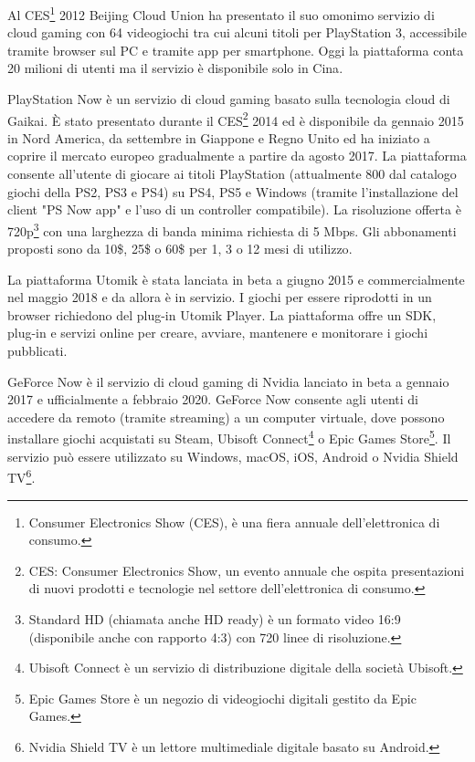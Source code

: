 Al CES\footnote{Consumer Electronics Show (CES), è una fiera annuale dell'elettronica di consumo.} 2012 Beijing Cloud Union ha presentato il suo omonimo servizio di cloud gaming con 64 videogiochi tra cui alcuni titoli per PlayStation 3, accessibile tramite browser sul PC e tramite app per smartphone. Oggi la piattaforma conta 20 milioni di utenti ma il servizio è disponibile solo in Cina\cite{CloudUnion}.

PlayStation Now è un servizio di cloud gaming basato sulla tecnologia cloud di Gaikai. È stato presentato durante il CES\footnote{CES: Consumer Electronics Show, un evento annuale che ospita presentazioni di nuovi prodotti e tecnologie nel settore dell'elettronica di consumo.} 2014 ed è disponibile da gennaio 2015 in Nord America, da settembre in Giappone e Regno Unito ed ha iniziato a coprire il mercato europeo gradualmente a partire da agosto 2017. La piattaforma consente all'utente di giocare ai titoli PlayStation (attualmente 800 dal catalogo giochi della PS2, PS3 e PS4) su PS4, PS5 e Windows (tramite l'installazione del client "PS Now app" e l'uso di un controller compatibile). La risoluzione offerta è 720p\footnote{Standard HD (chiamata anche HD ready) è un formato video 16:9 (disponibile anche con rapporto 4:3) con 720 linee di risoluzione.} con una larghezza di banda minima richiesta di 5 Mbps. Gli abbonamenti proposti sono da 10\$, 25\$ o 60\$ per 1, 3 o 12 mesi di utilizzo\cite{PlayStation_Now}.

La piattaforma Utomik è stata lanciata in beta a giugno 2015 e commercialmente nel maggio 2018 e da allora è in servizio. I giochi per essere riprodotti in un browser richiedono del plug-in Utomik Player. La piattaforma offre un SDK, plug-in e servizi online per creare, avviare, mantenere e monitorare i giochi pubblicati\cite{Utomik}.

GeForce Now è il servizio di cloud gaming di Nvidia lanciato in beta a gennaio 2017 e ufficialmente a febbraio 2020. GeForce Now consente agli utenti di accedere da remoto (tramite streaming) a un computer virtuale, dove possono installare giochi acquistati su Steam, Ubisoft Connect\footnote{Ubisoft Connect è un servizio di distribuzione digitale della società Ubisoft.} o Epic Games Store\footnote{Epic Games Store è un negozio di videogiochi digitali gestito da Epic Games.}. Il servizio può essere utilizzato su Windows, macOS, iOS, Android o Nvidia Shield TV\footnote{Nvidia Shield TV è un lettore multimediale digitale basato su Android.}\cite{GeForce_Now}.

